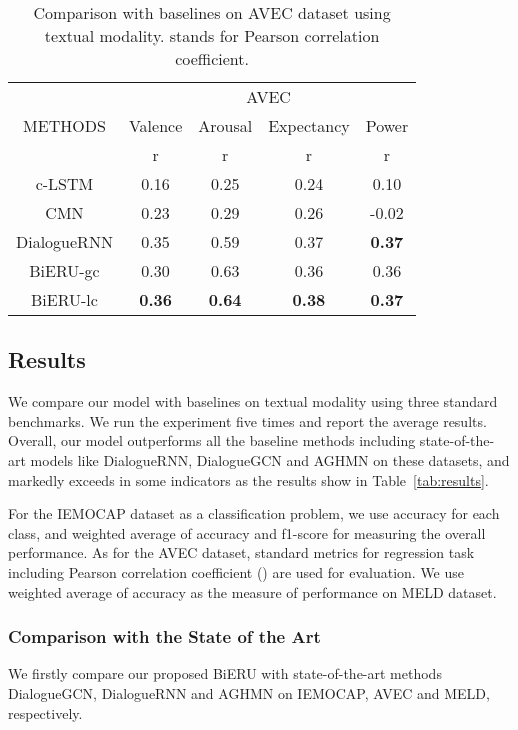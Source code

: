 \documentclass[journal]{IEEEtran}
\begin{document}
\begin{table}[!ht]
    \centering
    \begin{tabular}{|c|c|c|c|c|}
    \hline
    \multirow{3}{*}{METHODS} & \multicolumn{4}{c|}{AVEC} \\
    \cline{2-5}
    & \multicolumn{1}{c|}{Valence} & \multicolumn{1}{c|}{Arousal} & \multicolumn{1}{c|}{Expectancy} & \multicolumn{1}{c|}{Power} \\
    \cline{2-5}
	&	r	&	r	&	r	&	r \\

\hline
c-LSTM & 0.16 & 0.25 & 0.24 & 0.10   \\
\hline
CMN &  0.23 & 0.29 &  0.26 & -0.02  \\
\hline
DialogueRNN	&	0.35	&	0.59	&	0.37	&	\textbf{0.37}   \\
\hline
BiERU-gc	& 0.30	&	0.63	&	0.36	&	0.36  \\
\hline
BiERU-lc	& \textbf{0.36}	&	\textbf{0.64}	&	\textbf{0.38}	&	\textbf{0.37} \\
    \hline
    \end{tabular}
\linespread{1}
    \caption{Comparison with baselines on AVEC dataset using textual modality.  stands for Pearson correlation coefficient.}
    \label{tab:result_avec}
\end{table}



\subsection{Results}
We compare our model with baselines on textual modality using three standard benchmarks. We run the experiment five times and report the average results. Overall, our model outperforms all the baseline methods including state-of-the-art models like DialogueRNN, DialogueGCN and AGHMN on these datasets, and markedly exceeds in some indicators as the results show in Table~\ref{tab:results}. 

For the IEMOCAP dataset as a classification problem, we use accuracy for each class, and weighted average of accuracy and f1-score for measuring the overall performance. As for the AVEC dataset, standard metrics for regression task including Pearson correlation coefficient () are used for evaluation. We use weighted average of accuracy as the measure of performance on MELD dataset.

\subsubsection{Comparison with the State of the Art}
We firstly compare our proposed BiERU with state-of-the-art methods DialogueGCN, DialogueRNN and AGHMN on IEMOCAP, AVEC and MELD, respectively.
\end{document}
